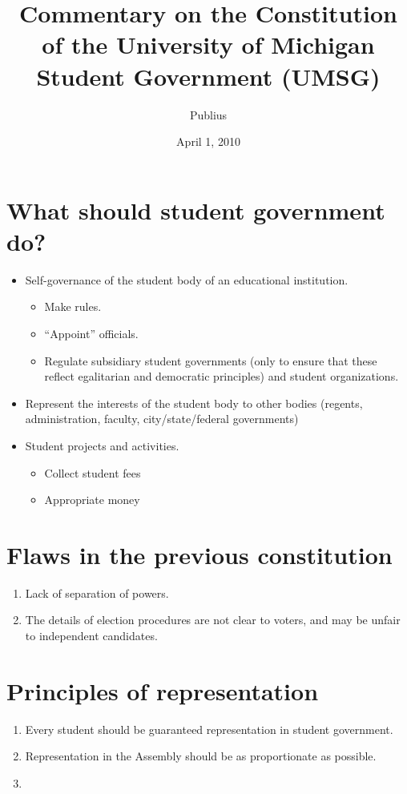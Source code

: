 \documentclass[12pt,letterpaper]{article}
\begin{document}
\title{Commentary on the Constitution of the University of Michigan Student Government (UMSG)}
\author{Publius}
\date{April 1, 2010}
\maketitle


\section*{What should student government do?}
\begin{itemize}
	\item Self-governance of the student body of an educational institution.
	\begin{itemize}
		\item Make rules.
		\item ``Appoint'' officials.
		\item Regulate subsidiary student governments (only to ensure that these reflect egalitarian and democratic principles) and student organizations.
	\end{itemize}
	\item Represent the interests of the student body to other bodies (regents, administration, faculty, city/state/federal governments)
	\item Student projects and activities.
	\begin{itemize}
		\item Collect student fees
		\item Appropriate money
	\end{itemize}
\end{itemize}


\section*{Flaws in the previous constitution}

\begin{enumerate}
	\item Lack of separation of powers.
	\item The details of election procedures are not clear to voters, and may be unfair to independent candidates.
\end{enumerate}


\section*{Principles of representation}

\begin{enumerate}
	\item Every student should be guaranteed representation in student government.
	\item Representation in the Assembly should be as proportionate as possible.
	\item
\end{enumerate}
\end{document}

